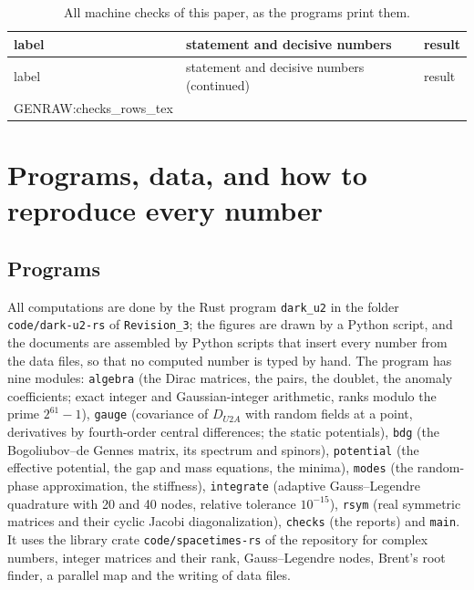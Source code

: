 {\footnotesize
\begin{longtable}{p{}p{}p{}}
\caption{All machine checks of this paper, as the programs print them.}\label{tab:checks}\\
\toprule
label & statement and decisive numbers & result\\
\midrule
\endfirsthead
\toprule
label & statement and decisive numbers (continued) & result\\
\midrule
\endhead
\bottomrule
\endfoot
{{GENRAW:checks_rows_tex}}
\end{longtable}
}

\section{Programs, data, and how to reproduce every number}
\label{app:data}

\subsection{Programs}

All computations are done by the Rust program \texttt{dark\_u2} in the folder
\texttt{code/dark-u2-rs} of \texttt{Revision\_3}; the figures are drawn by a Python script, and the
documents are assembled by Python scripts that insert every number from the data files, so that no
computed number is typed by hand. The program has nine modules: \texttt{algebra} (the Dirac matrices,
the pairs, the doublet, the anomaly coefficients; exact integer and Gaussian-integer arithmetic, ranks
modulo the prime $2^{61}-1$), \texttt{gauge} (covariance of $D_{U2A}$ with random fields at a point,
derivatives by fourth-order central differences; the static potentials), \texttt{bdg} (the
Bogoliubov--de Gennes matrix, its spectrum and spinors), \texttt{potential} (the effective potential,
the gap and mass equations, the minima), \texttt{modes} (the random-phase approximation, the
stiffness), \texttt{integrate} (adaptive Gauss--Legendre quadrature with 20 and 40 nodes, relative
tolerance $10^{-15}$), \texttt{rsym} (real symmetric matrices and their cyclic Jacobi
diagonalization), \texttt{checks} (the reports) and \texttt{main}. It uses the library crate
\texttt{code/spacetimes-rs} of the repository for complex numbers, integer matrices and their rank,
Gauss--Legendre nodes, Brent's root finder, a parallel map and the writing of data files.

